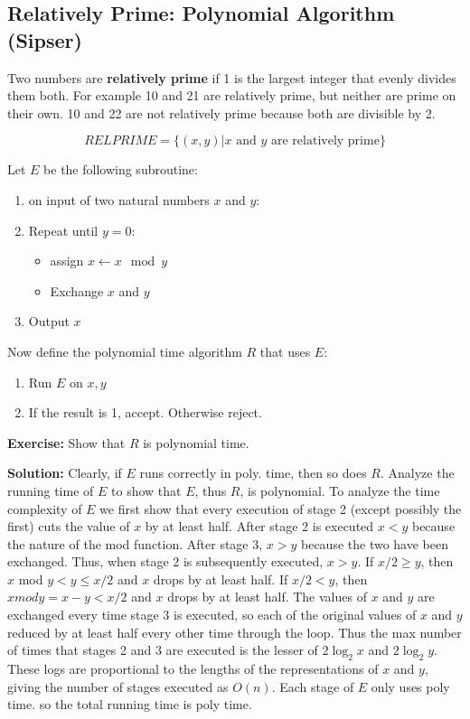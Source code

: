 \documentclass[11pt]{article}
\theoremstyle{definition}
\theoremstyle{remark}
\begin{document}
\subsection{Relatively Prime: Polynomial Algorithm (Sipser)}

\noindent Two numbers are \textbf{relatively prime} if 1 is the largest integer
that evenly divides them both. For example 10 and 21 are relatively prime, but neither
are prime on their own. 10 and 22 are not relatively prime because both are divisible by 2.

$$ RELPRIME = \{ (x,y) | x \text{ and } y \text{ are relatively prime} \} $$

\noindent Let $E$ be the following subroutine: 
\begin{enumerate}
\item on input of two natural numbers $x$ and $y$:
\item Repeat until $y = 0$:
	\begin{itemize}
		\item assign $x \leftarrow x \mod y$
		\item Exchange $x$ and $y$
	\end{itemize}
\item Output $x$
\end{enumerate}

\noindent Now define the polynomial time algorithm $R$ that uses $E$:
\begin{enumerate}
\item Run $E$ on $x,y$
\item If the result is 1, accept. Otherwise reject.
\end{enumerate}

\noindent \textbf{Exercise:} Show that $R$ is polynomial time.

\noindent \textbf{Solution:} Clearly, if $E$ runs correctly in poly. time, then so does $R$. Analyze the running time of $E$ to show that $E$, thus $R$, is polynomial.
To analyze the time complexity of $E$ we first show that every execution of stage 2 (except
possibly the first) cuts the value of $x$ by at least half. After stage 2 is executed
$x < y$ because the nature of the mod function. After stage 3, $x > y$ because the
two have been exchanged. Thus, when stage 2 is subsequently executed, $x > y$. 
If $x/2 \geq y$, then $x$ mod $y < y \leq x/2$ and $x$ drops by at least half. If $x/2 < y$, then
$x mod y = x - y < x/2$ and $x$ drops by at least half. The values of $x$ and $y$ are exchanged
every time stage 3 is executed, so each of the original values of $x$ and $y$ reduced by 
at least half every other time through the loop. 
Thus the max number of times that stages 2 and 3 are executed is the lesser of 
$2\log_2 x$ and $2 \log_2 y$. These logs are proportional to the lengths of the 
representations of $x$ and $y$, giving the number of stages executed as $O(n)$.
Each stage of $E$ only uses poly time. so the total running time is poly time.
\end{document}
